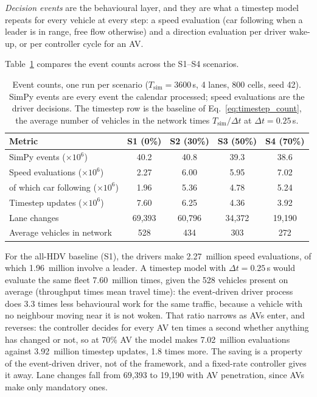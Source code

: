 \documentclass[review,number]{elsarticle}
\begin{document}
\emph{Decision events} are the behavioural layer, and they are what a timestep model repeats for every vehicle at every step: a speed evaluation (car following when a leader is in range, free flow otherwise) and a direction evaluation per driver wake-up, or per controller cycle for an AV.

Table~\ref{tab:computational} compares the event counts across the S1--S4 scenarios.

\begin{table}[ht]
\centering
\caption{Event counts, one run per scenario ($T_{\text{sim}} = 3600$\,s, 4 lanes, 800 cells, seed 42). SimPy events are every event the calendar processed; speed evaluations are the driver decisions. The timestep row is the baseline of Eq.~\eqref{eq:timestep_count}, the average number of vehicles in the network times $T_{\text{sim}} / \Delta t$ at $\Delta t = 0.25$\,s.}
\label{tab:computational}
\begin{tabular}{@{}lcccc@{}}
\toprule
Metric & S1 (0\%) & S2 (30\%) & S3 (50\%) & S4 (70\%) \\
\midrule
SimPy events ($\times 10^6$) & 40.2 & 40.8 & 39.3 & 38.6 \\
Speed evaluations ($\times 10^6$) & 2.27 & 6.00 & 5.95 & 7.02 \\
of which car following ($\times 10^6$) & 1.96 & 5.36 & 4.78 & 5.24 \\
Timestep updates ($\times 10^6$) & 7.60 & 6.25 & 4.36 & 3.92 \\
Lane changes & 69{,}393 & 60{,}796 & 34{,}372 & 19{,}190 \\
Average vehicles in network & 528 & 434 & 303 & 272 \\
\bottomrule
\end{tabular}
\end{table}

For the all-HDV baseline (S1), the drivers make 2.27~million speed evaluations, of which 1.96~million involve a leader. A timestep model with $\Delta t = 0.25$\,s would evaluate the same fleet 7.60~million times, given the 528 vehicles present on average (throughput times mean travel time): the event-driven driver process does 3.3 times less behavioural work for the same traffic, because a vehicle with no neighbour moving near it is not woken. That ratio narrows as AVs enter, and reverses: the controller decides for every AV ten times a second whether anything has changed or not, so at 70\% AV the model makes 7.02~million evaluations against 3.92~million timestep updates, 1.8 times more. The saving is a property of the event-driven driver, not of the framework, and a fixed-rate controller gives it away. Lane changes fall from 69{,}393 to 19{,}190 with AV penetration, since AVs make only mandatory ones.
\end{document}
